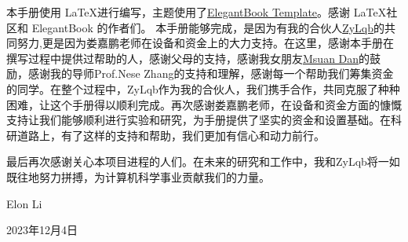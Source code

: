 \documentclass[lang=cn,10pt]{elegantbook}
\begin{document}
本手册使用 \LaTeX 进行编写，主题使用了\href{https://www.overleaf.com/latex/templates/elegantbook-template/zpsrbmdsxrgy}{ElegantBook Template}。感谢 \LaTeX 社区和 ElegantBook 的作者们。
本手册能够完成，是因为有我的合伙人\href{https://github.com/ZyLqb}{ZyLqb}的共同努力,更是因为娄嘉鹏老师在设备和资金上的大力支持。在这里，感谢本手册在撰写过程中提供过帮助的人，感谢父母的支持，感谢我女朋友\href{https://github.com/AsuanC}{Msuan Dan}的鼓励，感谢我的导师Prof.Nese Zhang的支持和理解，感谢每一个帮助我们筹集资金的同学。在整个过程中，ZyLqb作为我的合伙人，我们携手合作，共同克服了种种困难，让这个手册得以顺利完成。再次感谢娄嘉鹏老师，在设备和资金方面的慷慨支持让我们能够顺利进行实验和研究，为手册提供了坚实的资金和设置基础。在科研道路上，有了这样的支持和帮助，我们更加有信心和动力前行。

最后再次感谢关心本项目进程的人们。在未来的研究和工作中，我和ZyLqb将一如既往地努力拼搏，为计算机科学事业贡献我们的力量。

\hfill Elon Li

\hfill \hspace{2em} 2023年12月4日
\end{document}
